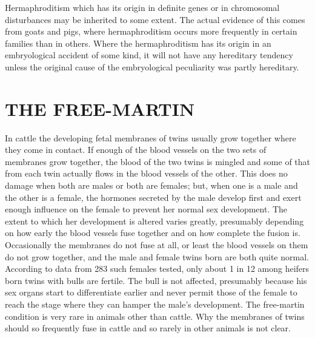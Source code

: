 Hermaphroditism which has its origin in definite genes or in chromosomal
disturbances may be inherited to some extent. The actual evidence
of this comes from goats and pigs, where hermaphroditism occurs
more frequently in certain families than in others. Where the hermaphroditism
has its origin in an embryological accident of some kind,
it will not have any hereditary tendency unless the original cause of
the embryological peculiarity was partly hereditary.

\section*{THE FREE-MARTIN}

In cattle the developing fetal membranes of twins usually grow
together where they come in contact. If enough of the blood vessels on
the two sets of membranes grow together, the blood of the two twins is
mingled and some of that from each twin actually flows in the blood
vessels of the other. This does no damage when both are males or both
are females; but, when one is a male and the other is a female, the hormones
secreted by the male develop first and exert enough influence on
the female to prevent her normal sex development. The extent to which
her development is altered varies greatly, presumably depending on
how early the blood vessels fuse together and on how complete the
fusion is. Occasionally the membranes do not fuse at all, or least the
blood vessels on them do not grow together, and the male and female
twins born are both quite normal. According to data from 283 such
females tested, only about 1 in 12 among heifers born twins with bulls
are fertile. The bull is not affected, presumably because his sex organs
start to differentiate earlier and never permit those of the female to
reach the stage where they can hamper the male's development. The
free-martin condition is very rare in animals other than cattle. Why the
membranes of twins should so frequently fuse in cattle and so rarely in
other animals is not clear.

